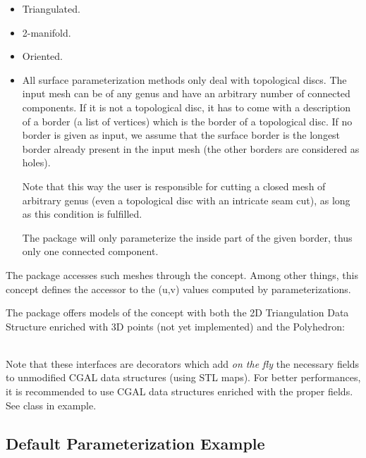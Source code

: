 \begin{itemize}

\item Triangulated.

\item 2-manifold.

\item Oriented.

\item All surface parameterization methods only deal with topological discs.
The input mesh can be of any genus and have an arbitrary number of
connected components.  If it is not a topological disc, it has to come
with a description of a border (a list of vertices) which is the
border of a topological disc.  If no border is given as input, we
assume that the surface border is the longest border already
present in the input mesh (the other borders are considered as
holes).

Note that this way the user is responsible for cutting a closed mesh
of arbitrary genus (even a topological disc with an intricate seam
cut), as long as this condition is fulfilled.

The package will only parameterize the inside part of the given
border, thus only one connected component.

\end{itemize}

The package accesses such meshes through the
 concept. Among other things, this concept
defines the accessor to the (u,v) values computed by
parameterizations.

The package offers models of the concept
 with both the 2D Triangulation Data
Structure enriched with 3D points (not yet implemented) and the
Polyhedron:

  \\

Note that these interfaces are decorators which add {\em on the fly}
the necessary fields to unmodified CGAL data structures (using STL
maps). For better performances, it is recommended to use CGAL data
structures enriched with the proper fields. See 
class in  example.


\subsection{Default Parameterization Example}

